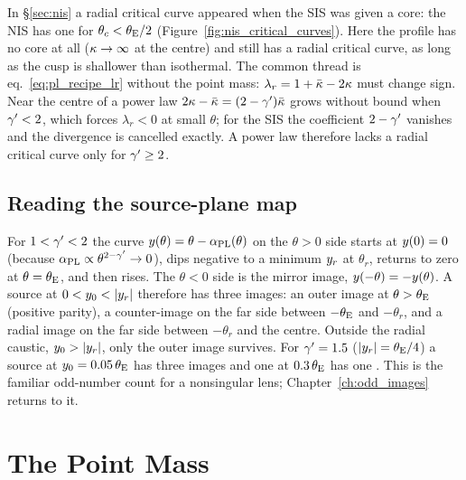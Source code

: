 \begin{bridge}
In \S\ref{sec:nis} a radial critical curve appeared when the SIS was
given a core: the NIS has one for $\theta_c<\theta_{\mathrm{E}}/2$
(Figure~\ref{fig:nis_critical_curves}).  Here the profile has no core
at all ($\kappa\to\infty$ at the centre) and still has a radial
critical curve, as long as the cusp is shallower than
isothermal.  The common thread is eq.~\eqref{eq:pl_recipe_lr} without
the point mass: $\lambda_r=1+\bar\kappa-2\kappa$ must change sign.
Near the centre of a power law $2\kappa-\bar\kappa=(2-\gamma')\bar\kappa$
grows without bound when $\gamma'<2$, which forces $\lambda_r<0$ at small
$\theta$; for the SIS the coefficient $2-\gamma'$ vanishes and the
divergence is cancelled exactly.  A power law therefore lacks a radial
critical curve only for $\gamma'\ge2$.
\end{bridge}

\subsection{Reading the source-plane map}
\label{sec:pl_reading_map}

For $1<\gamma'<2$ the curve $y(\theta)=\theta-\alpha_{\rm PL}(\theta)$
on the $\theta>0$ side starts at $y(0)=0$ (because
$\alpha_{\rm PL}\propto\theta^{2-\gamma'}\to0$), dips negative to a minimum
$y_r$ at $\theta_r$, returns to zero at $\theta=\theta_{\mathrm{E}}$, and then
rises.  The $\theta<0$ side is the mirror image, $y(-\theta)=-y(\theta)$.
A source at $0<\ysrc_0<|\ysrc_r|$ therefore has three images: an
outer image at $\theta>\theta_{\mathrm{E}}$ (positive parity), a counter-image on
the far side between $-\theta_{\mathrm{E}}$ and $-\theta_r$, and a radial image on
the far side between $-\theta_r$ and the centre.
Outside the radial caustic, $y_0>|y_r|$, only the outer image
survives.  For $\gamma'=1.5$ ($|y_r|=\theta_{\mathrm{E}}/4$) a source at
$y_0=0.05\,\theta_{\mathrm{E}}$ has three images and one at $0.3\,\theta_{\mathrm{E}}$ has
one .  This is the familiar odd-number count for a
nonsingular lens; Chapter~\ref{ch:odd_images} returns to it.


\section{The Point Mass}
\label{sec:pl_point_mass}

